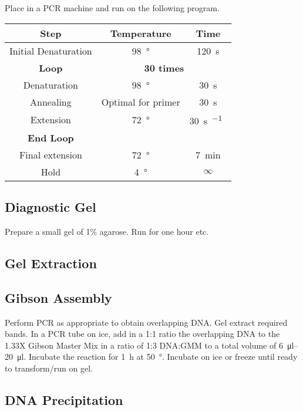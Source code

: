 \documentclass[../main.tex]{subfiles}
\begin{document}
Place in a PCR machine and run on the following program.

\begin{center}
\begin{tabular}{c|cc}
\textbf{Step}&\textbf{Temperature}&\textbf{Time}\\\hline
Initial Denaturation	& \SI{98}{\degree} & \SI{120}{\second}\\\hline
\textbf{Loop}&\multicolumn{2}{c}{\textbf{30 times}}\\
Denaturation		&	\SI{98}{\degree}		&	\SI{30}{\second}\\
Annealing 		&	Optimal for primer	&	\SI{30}{\second}\\
Extension		&	\SI{72}{\degree}		&	\SI{30}{\second\per\kilo\base}\\
\textbf{End Loop}	&	& \\\hline
Final extension	&	\SI{72}{\degree}		&	\SI{7}{\minute}\\
Hold				&	\SI{4}{\degree}		&	\(\infty\)
\end{tabular}
\end{center}

\subsection{Diagnostic Gel}

Prepare a small gel of 1\% agarose. Run for one hour etc.

\subsection{Gel Extraction}

\subsection{Gibson Assembly}

Perform PCR as appropriate to obtain overlapping DNA.
Gel extract required bands.
In a PCR tube on ice, add in a 1:1 ratio the overlapping DNA to the 1.33X Gibson Master Mix in a ratio of 1:3 DNA:GMM to a total volume of \SIrange{6}{20}{\micro\litre}.
Incubate the reaction for \SI{1}{\hour} at \SI{50}{\degree}. Incubate on ice or freeze until ready to transform/run on gel.


\subsection{DNA Precipitation}
\end{document}

